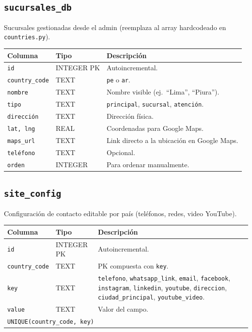 \documentclass[11pt,a4paper]{article}
\begin{document}
\subsection{\texttt{sucursales\_db}}
Sucursales gestionadas desde el admin (reemplaza al array hardcodeado en
\texttt{countries.py}).

\begin{longtable}{p{3.5cm} p{2cm} p{8cm}}
\toprule
\textbf{Columna} & \textbf{Tipo} & \textbf{Descripción} \\
\midrule
\endhead
\texttt{id}            & INTEGER PK & Autoincremental. \\
\texttt{country\_code} & TEXT       & \texttt{pe} o \texttt{ar}. \\
\texttt{nombre}        & TEXT       & Nombre visible (ej.\ ``Lima'', ``Piura''). \\
\texttt{tipo}          & TEXT       & \texttt{principal}, \texttt{sucursal}, \texttt{atención}. \\
\texttt{dirección}     & TEXT       & Dirección física. \\
\texttt{lat, lng}      & REAL       & Coordenadas para Google Maps. \\
\texttt{maps\_url}     & TEXT       & Link directo a la ubicación en Google Maps. \\
\texttt{teléfono}      & TEXT       & Opcional. \\
\texttt{orden}         & INTEGER    & Para ordenar manualmente. \\
\bottomrule
\end{longtable}

\subsection{\texttt{site\_config}}
Configuración de contacto editable por país (teléfonos, redes, video
YouTube).

\begin{longtable}{p{3.5cm} p{2cm} p{8cm}}
\toprule
\textbf{Columna} & \textbf{Tipo} & \textbf{Descripción} \\
\midrule
\endhead
\texttt{id}            & INTEGER PK & Autoincremental. \\
\texttt{country\_code} & TEXT       & PK compuesta con \texttt{key}. \\
\texttt{key}           & TEXT       & \texttt{telefono}, \texttt{whatsapp\_link}, \texttt{email}, \texttt{facebook}, \texttt{instagram}, \texttt{linkedin}, \texttt{youtube}, \texttt{direccion}, \texttt{ciudad\_principal}, \texttt{youtube\_video}. \\
\texttt{value}         & TEXT       & Valor del campo. \\
\multicolumn{3}{l}{\texttt{UNIQUE(country\_code, key)}} \\
\bottomrule
\end{longtable}
\end{document}

